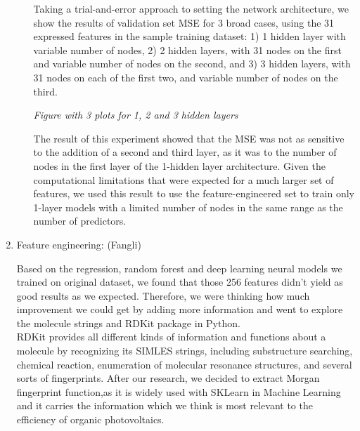 \documentclass[11pt]{article}
\begin{document}
\begin{enumerate}
\begin{enumerate}
Taking a trial-and-error approach to setting the network architecture, we show the results of validation set MSE for 3 broad cases, using the 31 expressed features in the sample training dataset: 1) 1 hidden layer with variable number of nodes, 2) 2 hidden layers, with 31 nodes on the first and variable number of nodes on the second, and 3) 3 hidden layers, with 31 nodes on each of the first two, and variable number of nodes on the third.

\emph{Figure with 3 plots for 1, 2 and 3 hidden layers}

The result of this experiment showed that the MSE was not as sensitive to the addition of a second and third layer, as it was to the number of nodes in the first layer of the 1-hidden layer architecture. Given the computational limitations that were expected for a much larger set of features, we used this result to use the feature-engineered set to train only 1-layer models with a limited number of nodes in the same range as the number of predictors.


\end{enumerate}
\item Feature engineering: (Fangli)

Based on the regression, random forest and deep learning neural models we trained on original dataset, we found that those 256 features didn't yield as good results as we expected. Therefore, we were thinking how much improvement we could get by adding more information and went to explore the molecule strings and RDKit package in Python. \\

RDKit provides all different kinds of information and functions about a molecule by recognizing its SIMLES strings, including substructure searching, chemical reaction, enumeration of molecular resonance structures, and several sorts of fingerprints. After our research, we decided to extract Morgan fingerprint function,as it is widely used with SKLearn in Machine Learning and it carries the information which we think is most relevant to the efficiency of organic photovoltaics. \\ 


\end{enumerate}
\end{document}
